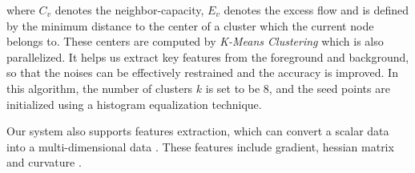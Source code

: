 where $C_v$ denotes the neighbor-capacity, $E_v$ denotes the excess flow and is defined by the minimum distance to the center of a cluster which the current node belongs to.
These centers are computed by \textit{K-Means Clustering} which is also parallelized.
It helps us extract key features from the foreground and background, so that the noises can be effectively restrained and the accuracy is improved.
In this algorithm, the number of clusters $k$ is set to be 8, and the seed points are initialized using a histogram equalization technique.

Our system also supports features extraction, which can convert a scalar data into a multi-dimensional data \cite{10PC}.
These features include gradient, hessian matrix \cite{02KKH} and curvature \cite{03KWTM}.
